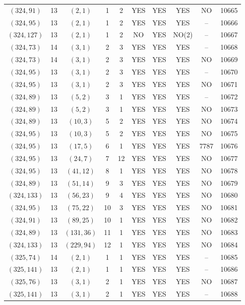 \begin{longtable}{|c|c|c|c|c|c|c|c|c|c|}
$(324, 91)$ & 13 & $(2, 1)$ & 1 & 2 & YES & YES & YES & NO & 10665\\
$(324, 95)$ & 13 & $(2, 1)$ & 1 & 2 & YES & YES & YES & -- & 10666\\
$(324, 127)$ & 13 & $(2, 1)$ & 1 & 2 & NO & YES & NO(2) & -- & 10667\\
$(324, 73)$ & 14 & $(3, 1)$ & 2 & 3 & YES & YES & YES & -- & 10668\\
$(324, 73)$ & 14 & $(3, 1)$ & 2 & 3 & YES & YES & YES & NO & 10669\\
$(324, 95)$ & 13 & $(3, 1)$ & 2 & 3 & YES & YES & YES & -- & 10670\\
$(324, 95)$ & 13 & $(3, 1)$ & 2 & 3 & YES & YES & YES & NO & 10671\\
$(324, 89)$ & 13 & $(5, 2)$ & 3 & 1 & YES & YES & YES & -- & 10672\\
$(324, 89)$ & 13 & $(5, 2)$ & 3 & 1 & YES & YES & YES & NO & 10673\\
$(324, 89)$ & 13 & $(10, 3)$ & 5 & 2 & YES & YES & YES & NO & 10674\\
$(324, 95)$ & 13 & $(10, 3)$ & 5 & 2 & YES & YES & YES & NO & 10675\\
$(324, 95)$ & 13 & $(17, 5)$ & 6 & 1 & YES & YES & YES & 7787 & 10676\\
$(324, 95)$ & 13 & $(24, 7)$ & 7 & 12 & YES & YES & YES & NO & 10677\\
$(324, 95)$ & 13 & $(41, 12)$ & 8 & 1 & YES & YES & YES & NO & 10678\\
$(324, 89)$ & 13 & $(51, 14)$ & 9 & 3 & YES & YES & YES & NO & 10679\\
$(324, 133)$ & 13 & $(56, 23)$ & 9 & 4 & YES & YES & YES & NO & 10680\\
$(324, 95)$ & 13 & $(75, 22)$ & 10 & 3 & YES & YES & YES & NO & 10681\\
$(324, 91)$ & 13 & $(89, 25)$ & 10 & 1 & YES & YES & YES & NO & 10682\\
$(324, 89)$ & 13 & $(131, 36)$ & 11 & 1 & YES & YES & YES & NO & 10683\\
$(324, 133)$ & 13 & $(229, 94)$ & 12 & 1 & YES & YES & YES & NO & 10684\\
$(325, 74)$ & 14 & $(2, 1)$ & 1 & 1 & YES & YES & YES & -- & 10685\\
$(325, 141)$ & 13 & $(2, 1)$ & 1 & 1 & YES & YES & YES & -- & 10686\\
$(325, 76)$ & 13 & $(3, 1)$ & 2 & 1 & YES & YES & YES & NO & 10687\\
$(325, 141)$ & 13 & $(3, 1)$ & 2 & 1 & YES & YES & YES & -- & 10688\\

\end{longtable}
